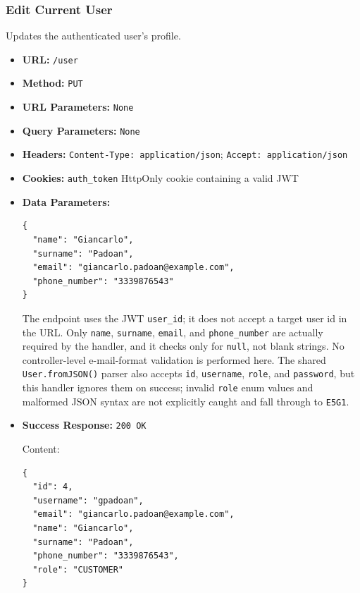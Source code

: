 \subsubsection*{Edit Current User}

Updates the authenticated user's profile.

\begin{itemize}[nosep]
\item \textbf{URL:} \texttt{/user}

\item \textbf{Method:} \texttt{PUT}

\item \textbf{URL Parameters:} \texttt{None}

\item \textbf{Query Parameters:} \texttt{None}

\item \textbf{Headers:} \texttt{Content-Type: application/json}; \texttt{Accept: application/json}

\item \textbf{Cookies:} \texttt{auth\_token} HttpOnly cookie containing a valid JWT

\item \textbf{Data Parameters:}

\begin{lstlisting}
{
  "name": "Giancarlo",
  "surname": "Padoan",
  "email": "giancarlo.padoan@example.com",
  "phone_number": "3339876543"
}
\end{lstlisting}

The endpoint uses the JWT \texttt{user\_id}; it does not accept a target user id in the URL. Only \texttt{name}, \texttt{surname}, \texttt{email}, and \texttt{phone\_number} are actually required by the handler, and it checks only for \texttt{null}, not blank strings. No controller-level e-mail-format validation is performed here. The shared \texttt{User.fromJSON()} parser also accepts \texttt{id}, \texttt{username}, \texttt{role}, and \texttt{password}, but this handler ignores them on success; invalid \texttt{role} enum values and malformed JSON syntax are not explicitly caught and fall through to \texttt{E5G1}.

\item \textbf{Success Response:} \texttt{200 OK}

Content:

\begin{lstlisting}
{
  "id": 4,
  "username": "gpadoan",
  "email": "giancarlo.padoan@example.com",
  "name": "Giancarlo",
  "surname": "Padoan",
  "phone_number": "3339876543",
  "role": "CUSTOMER"
}
\end{lstlisting}


\end{itemize}
